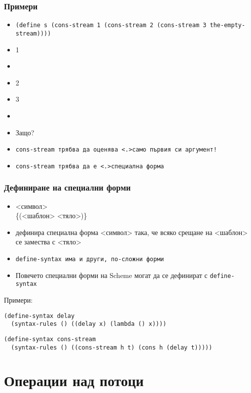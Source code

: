 \documentclass{beamer}
\begin{document}
\begin{frame}
  \frametitle{Примери}
  \begin{itemize}[<+->]
  \item \tt{(define s (cons-stream 1 (cons-stream 2 (cons-stream 3 the-empty-stream))))}
  \item {}1
  \item {}
  \item {}2
  \item {}3
  \item {}
  \item<+-| alert@+>Защо?
  \item \tt{cons-stream} трябва да оценява \alert<.>{само първия си аргумент}!
  \item \tt{cons-stream} трябва да е \alert<.>{специална форма}
  \end{itemize}
\end{frame}

\begin{frame}[fragile]
  \frametitle{Дефиниране на специални форми}
  \begin{itemize}[<+->]
  \item {} <символ>\\
    \hspace{5ex}\{\tta(<шаблон> <тяло>\tta)\}\tta{))}
  \item дефинира специална форма <символ> така, че всяко срещане на <шаблон> се замества с <тяло>
  \item \tt{define-syntax} има и други, по-сложни форми
  \item Повечето специални форми на Scheme могат да се дефинират с \tt{define-syntax}
  \end{itemize}
  \onslide<+->
  Примери:
  \onslide<+->
\begin{verbatim}
(define-syntax delay
  (syntax-rules () ((delay x) (lambda () x))))
\end{verbatim}
  \onslide<+->
\begin{verbatim}
(define-syntax cons-stream
  (syntax-rules () ((cons-stream h t) (cons h (delay t)))))
\end{verbatim}
\end{frame}

\section{Операции над потоци}
\end{document}

